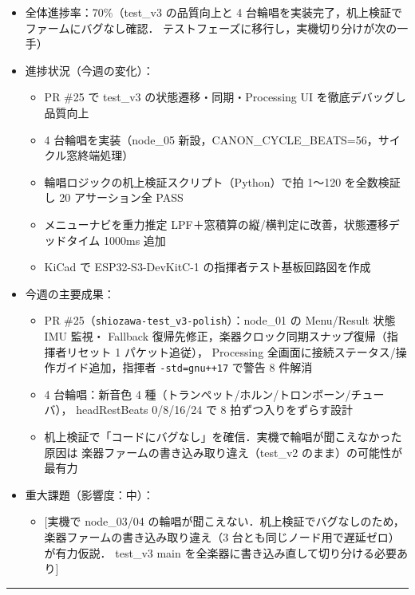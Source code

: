 \documentclass[uplatex,dvipdfmx,a4paper,11pt]{jsarticle}
\newcommand{\sectionrule}{\par\medskip\noindent\rule{\linewidth}{0.6pt}\par\medskip}
\begin{document}
\begin{itemize}
  \item 全体進捗率：70\%（test\_v3 の品質向上と 4 台輪唱を実装完了，机上検証でファームにバグなし確認．
        テストフェーズに移行し，実機切り分けが次の一手）
  \item 進捗状況（今週の変化）：
    \begin{itemize}
      \item PR \#25 で test\_v3 の状態遷移・同期・Processing UI を徹底デバッグし品質向上
      \item 4 台輪唱を実装（node\_05 新設，CANON\_CYCLE\_BEATS=56，サイクル窓終端処理）
      \item 輪唱ロジックの机上検証スクリプト（Python）で拍 1〜120 を全数検証し 20 アサーション全 PASS
      \item メニューナビを重力推定 LPF＋窓積算の縦/横判定に改善，状態遷移デッドタイム 1000ms 追加
      \item KiCad で ESP32-S3-DevKitC-1 の指揮者テスト基板回路図を作成
    \end{itemize}
  \item 今週の主要成果：
    \begin{itemize}
      \item PR \#25（\texttt{shiozawa-test\_v3-polish}）：node\_01 の Menu/Result 状態 IMU 監視・
            Fallback 復帰先修正，楽器クロック同期スナップ復帰（指揮者リセット 1 パケット追従），
            Processing 全画面に接続ステータス/操作ガイド追加，指揮者 \texttt{-std=gnu++17} で警告 8 件解消
      \item 4 台輪唱：新音色 4 種（トランペット/ホルン/トロンボーン/チューバ），
            headRestBeats 0/8/16/24 で 8 拍ずつ入りをずらす設計
      \item 机上検証で「コードにバグなし」を確信．実機で輪唱が聞こえなかった原因は
            楽器ファームの書き込み取り違え（test\_v2 のまま）の可能性が最有力
    \end{itemize}
  \item 重大課題（影響度：中）：
    \begin{itemize}
      \item {}[実機で node\_03/04 の輪唱が聞こえない．机上検証でバグなしのため，
            楽器ファームの書き込み取り違え（3 台とも同じノード用で遅延ゼロ）が有力仮説．
            test\_v3 main を全楽器に書き込み直して切り分ける必要あり]
    \end{itemize}
\end{itemize}

\sectionrule
\end{document}
